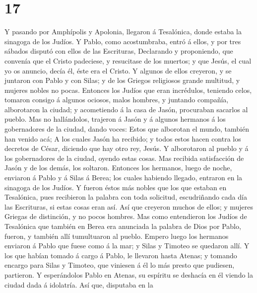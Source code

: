 \hypertarget{section-16}{%
\section{17}\label{section-16}}

 Y pasando por Amphípolis y Apolonia, llegaron á
Tesalónica, donde estaba la sinagoga de los Judíos.  Y
Pablo, como acostumbraba, entró á ellos, y por tres sábados disputó con
ellos de las Escrituras,  Declarando y proponiendo, que
convenía que el Cristo padeciese, y resucitase de los muertos; y que
Jesús, el cual yo os anuncio, decía él, éste era el Cristo.
 Y algunos de ellos creyeron, y se juntaron con Pablo y
con Silas; y de los Griegos religiosos grande multitud, y mujeres nobles
no pocas.  Entonces los Judíos que eran incrédulos,
teniendo celos, tomaron consigo á algunos ociosos, malos hombres, y
juntando compañía, alborotaron la ciudad; y acometiendo á la casa de
Jasón, procuraban sacarlos al pueblo.  Mas no hallándolos,
trajeron á Jasón y á algunos hermanos á los gobernadores de la ciudad,
dando voces: Estos que alborotan el mundo, también han venido acá;
 A los cuales Jasón ha recibido; y todos estos hacen
contra los decretos de César, diciendo que hay otro rey, Jesús.
 Y alborotaron al pueblo y á los gobernadores de la
ciudad, oyendo estas cosas.  Mas recibida satisfacción de
Jasón y de los demás, los soltaron.  Entonces los
hermanos, luego de noche, enviaron á Pablo y á Silas á Berea; los cuales
habiendo llegado, entraron en la sinagoga de los Judíos. 
Y fueron éstos más nobles que los que estaban en Tesalónica, pues
recibieron la palabra con toda solicitud, escudriñando cada día las
Escrituras, si estas cosas eran así.  Así que creyeron
muchos de ellos; y mujeres Griegas de distinción, y no pocos hombres.
 Mas como entendieron los Judíos de Tesalónica que
también en Berea era anunciada la palabra de Dios por Pablo, fueron, y
también allí tumultuaron al pueblo.  Empero luego los
hermanos enviaron á Pablo que fuese como á la mar; y Silas y Timoteo se
quedaron allí.  Y los que habían tomado á cargo á Pablo,
le llevaron hasta Atenas; y tomando encargo para Silas y Timoteo, que
viniesen á él lo más presto que pudiesen, partieron.  Y
esperándolos Pablo en Atenas, su espíritu se deshacía en él viendo la
ciudad dada á idolatría.  Así que, disputaba en la
